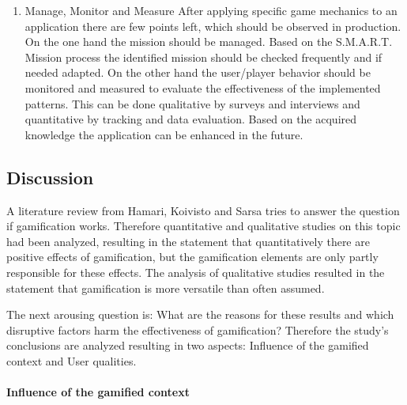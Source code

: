 \begin{enumerate}
	\item Manage, Monitor and Measure \newline
	After applying specific game mechanics to an application there are few points left, which should be observed in production. On the one hand the mission should be managed. Based on the S.M.A.R.T. Mission process the identified mission should be checked frequently and if needed adapted. On the other hand the user/player behavior should be monitored and measured to evaluate the effectiveness of the implemented patterns. This can be done qualitative by surveys and interviews and quantitative by tracking and data evaluation. Based on the acquired knowledge the application can be enhanced in the future.	\cite[p. 92-96]{kumarGamificationWorkDesigning2013}
\end{enumerate}

\newpage

\subsection{Discussion}
\label{sec:theoryBe}

A literature review from Hamari, Koivisto and Sarsa \cite{hamariDoesGamificationWork2014} tries to answer the question if gamification works. Therefore quantitative and qualitative studies on this topic had been analyzed, resulting in the statement that quantitatively there are positive effects of gamification, but the gamification elements are only partly responsible for these effects. The analysis of qualitative studies resulted in the statement that gamification is more versatile than often assumed. \cite[p. 3029, 3030]{hamariDoesGamificationWork2014} 

The next arousing question is: What are the reasons for these results and which disruptive factors harm the effectiveness of gamification? Therefore the study's conclusions are analyzed resulting in two aspects: Influence of the gamified context and User qualities. \cite[p. 3029, 3030]{hamariDoesGamificationWork2014}

\paragraph*{Influence of the gamified context}

